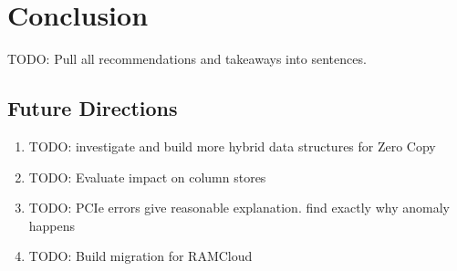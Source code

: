 
\chapter{Conclusion}
\label{chap:conclusion}
TODO: Pull all recommendations and takeaways into sentences.

\section{Future Directions}
\label{sec:futuredirections}

\begin{enumerate}
\item TODO:  investigate and build more hybrid data structures for Zero Copy
\item TODO: Evaluate impact on column stores
\item TODO: PCIe errors give reasonable explanation. find exactly why anomaly happens
\item TODO: Build migration for RAMCloud
\end{enumerate}